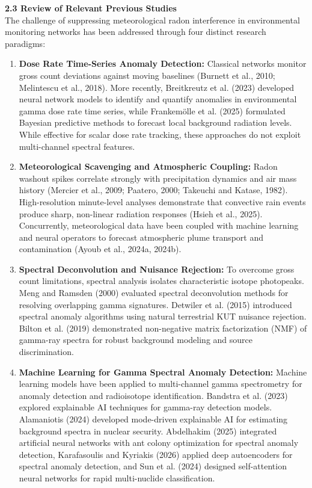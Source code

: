 \documentclass[11pt,a4paper]{article}
\begin{document}
\begin{framed}
\vspace{0.6em}
\noindent\textbf{2.3 Review of Relevant Previous Studies}\\[0.3em]
The challenge of suppressing meteorological radon interference in environmental monitoring networks has been addressed through four distinct research paradigms:
\begin{enumerate}
    \item \textbf{Dose Rate Time-Series Anomaly Detection:} Classical networks monitor gross count deviations against moving baselines (Burnett et al., 2010; Melintescu et al., 2018). More recently, Breitkreutz et al. (2023) developed neural network models to identify and quantify anomalies in environmental gamma dose rate time series, while Frankemölle et al. (2025) formulated Bayesian predictive methods to forecast local background radiation levels. While effective for scalar dose rate tracking, these approaches do not exploit multi-channel spectral features.
    \item \textbf{Meteorological Scavenging and Atmospheric Coupling:} Radon washout spikes correlate strongly with precipitation dynamics and air mass history (Mercier et al., 2009; Paatero, 2000; Takeuchi and Katase, 1982). High-resolution minute-level analyses demonstrate that convective rain events produce sharp, non-linear radiation responses (Hsieh et al., 2025). Concurrently, meteorological data have been coupled with machine learning and neural operators to forecast atmospheric plume transport and contamination (Ayoub et al., 2024a, 2024b).
    \item \textbf{Spectral Deconvolution and Nuisance Rejection:} To overcome gross count limitations, spectral analysis isolates characteristic isotope photopeaks. Meng and Ramsden (2000) evaluated spectral deconvolution methods for resolving overlapping gamma signatures. Detwiler et al. (2015) introduced spectral anomaly algorithms using natural terrestrial KUT nuisance rejection. Bilton et al. (2019) demonstrated non-negative matrix factorization (NMF) of gamma-ray spectra for robust background modeling and source discrimination.
    \item \textbf{Machine Learning for Gamma Spectral Anomaly Detection:} Machine learning models have been applied to multi-channel gamma spectrometry for anomaly detection and radioisotope identification. Bandstra et al. (2023) explored explainable AI techniques for gamma-ray detection models. Alamaniotis (2024) developed mode-driven explainable AI for estimating background spectra in nuclear security. Abdelhakim (2025) integrated artificial neural networks with ant colony optimization for spectral anomaly detection, Karafasoulis and Kyriakis (2026) applied deep autoencoders for spectral anomaly detection, and Sun et al. (2024) designed self-attention neural networks for rapid multi-nuclide classification.
\end{enumerate}


\end{framed}
\end{document}
